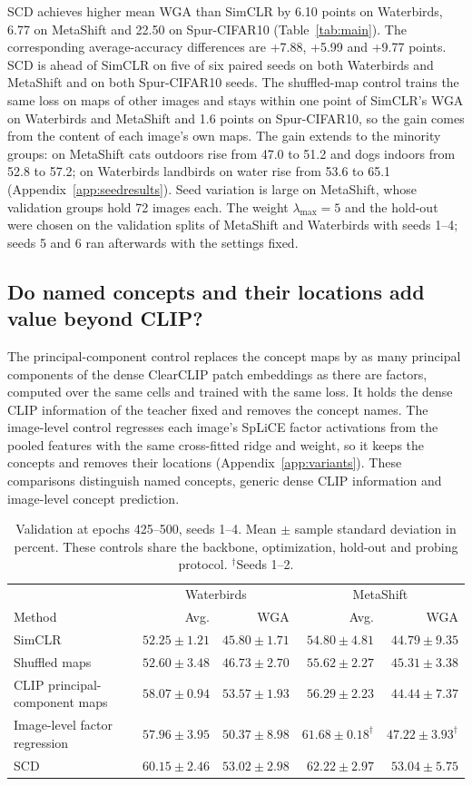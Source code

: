 \documentclass{article}
\begin{document}
SCD achieves higher mean WGA than SimCLR by 6.10 points on Waterbirds, 6.77 on MetaShift and 22.50 on Spur-CIFAR10 (Table~\ref{tab:main}). The corresponding average-accuracy differences are +7.88, +5.99 and +9.77 points. SCD is ahead of SimCLR on five of six paired seeds on both Waterbirds and MetaShift and on both Spur-CIFAR10 seeds. The shuffled-map control trains the same loss on maps of other images and stays within one point of SimCLR's WGA on Waterbirds and MetaShift and 1.6 points on Spur-CIFAR10, so the gain comes from the content of each image's own maps. The gain extends to the minority groups: on MetaShift cats outdoors rise from 47.0 to 51.2 and dogs indoors from 52.8 to 57.2; on Waterbirds landbirds on water rise from 53.6 to 65.1 (Appendix~\ref{app:seedresults}). Seed variation is large on MetaShift, whose validation groups hold 72 images each. The weight $\lambda_{\max}=5$ and the hold-out were chosen on the validation splits of MetaShift and Waterbirds with seeds 1--4; seeds 5 and 6 ran afterwards with the settings fixed.

\subsection{Do named concepts and their locations add value beyond CLIP?}
The principal-component control replaces the concept maps by as many principal components of the dense ClearCLIP patch embeddings as there are factors, computed over the same cells and trained with the same loss. It holds the dense CLIP information of the teacher fixed and removes the concept names. The image-level control regresses each image's SpLiCE factor activations from the pooled features with the same cross-fitted ridge and weight, so it keeps the concepts and removes their locations (Appendix~\ref{app:variants}). These comparisons distinguish named concepts, generic dense CLIP information and image-level concept prediction.

\begin{table}[htbp]
\centering\small
\caption{Validation at epochs 425--500, seeds 1--4. Mean $\pm$ sample standard deviation in percent. These controls share the backbone, optimization, hold-out and probing protocol. $^\dagger$Seeds 1--2.}
\begin{tabular}{lrrrr}
\toprule
& \multicolumn{2}{c}{Waterbirds} & \multicolumn{2}{c}{MetaShift} \\
Method & Avg. & WGA & Avg. & WGA \\
\midrule
SimCLR & $52.25\pm1.21$ & $45.80\pm1.71$ & $54.80\pm4.81$ & $44.79\pm9.35$ \\
Shuffled maps & $52.60\pm3.48$ & $46.73\pm2.70$ & $55.62\pm2.27$ & $45.31\pm3.38$ \\
CLIP principal-component maps & $58.07\pm0.94$ & $53.57\pm1.93$ & $56.29\pm2.23$ & $44.44\pm7.37$ \\
Image-level factor regression & $57.96\pm3.95$ & $50.37\pm8.98$ & $61.68\pm0.18^\dagger$ & $47.22\pm3.93^\dagger$ \\
SCD & $60.15\pm2.46$ & $53.02\pm2.98$ & $62.22\pm2.97$ & $53.04\pm5.75$ \\
\bottomrule
\end{tabular}
\label{tab:controls}
\end{table}
\end{document}
